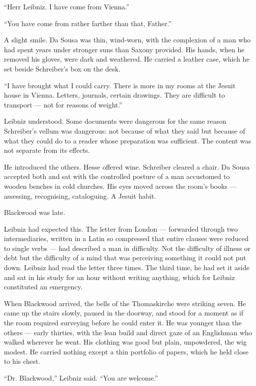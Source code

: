 ``Herr Leibniz. I have come from Vienna.''

``You have come from rather farther than that, Father.''

A slight smile. Da Sousa was thin, wind-worn, with the complexion of a man who had spent years under stronger suns than Saxony provided. His hands, when he removed his gloves, were dark and weathered. He carried a leather case, which he set beside Schreiber's box on the desk.

``I have brought what I could carry. There is more in my rooms at the Jesuit house in Vienna. Letters, journals, certain drawings. They are difficult to transport --- not for reasons of weight.''

Leibniz understood. Some documents were dangerous for the same reason Schreiber's vellum was dangerous: not because of what they said but because of what they could do to a reader whose preparation was sufficient. The content was not separate from its effects.

He introduced the others. Hesse offered wine. Schreiber cleared a chair. Da Sousa accepted both and sat with the controlled posture of a man accustomed to wooden benches in cold churches. His eyes moved across the room's books --- assessing, recognising, cataloguing. A Jesuit habit.

\scenebreak

Blackwood was late.

Leibniz had expected this. The letter from London --- forwarded through two intermediaries, written in a Latin so compressed that entire clauses were reduced to single verbs --- had described a man in difficulty. Not the difficulty of illness or debt but the difficulty of a mind that was perceiving something it could not put down. Leibniz had read the letter three times. The third time, he had set it aside and sat in his study for an hour without writing anything, which for Leibniz constituted an emergency.

When Blackwood arrived, the bells of the Thomaskirche were striking seven. He came up the stairs slowly, paused in the doorway, and stood for a moment as if the room required surveying before he could enter it. He was younger than the others --- early thirties, with the lean build and direct gaze of an Englishman who walked wherever he went. His clothing was good but plain, unpowdered, the wig modest. He carried nothing except a thin portfolio of papers, which he held close to his chest.

``Dr. Blackwood,'' Leibniz said. ``You are welcome.''

